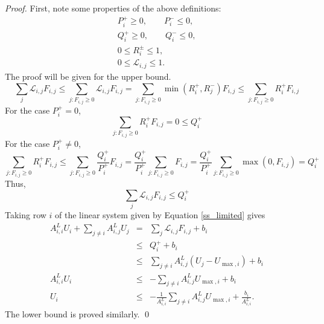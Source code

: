 \begin{proof}
   First, note some properties of the above definitions:
   \begin{gather*}
      P_i^+ \geq 0, \qquad P_i^- \leq 0,\\
      Q_i^+ \geq 0, \qquad Q_i^- \leq 0,\\
      0 \leq R_i^\pm \leq 1,\\
      0 \leq \mathcal{L}_{i,j} \leq 1.
   \end{gather*}
   The proof will be given for the upper bound.
   \[
      \sum\limits_j \mathcal{L}_{i,j}F_{i,j}
         \leq \sum\limits_{j:F_{i,j}\geq 0} \mathcal{L}_{i,j}F_{i,j}
         = \sum\limits_{j:F_{i,j}\geq 0} \min(R_i^+,R_j^-)F_{i,j}
         \leq \sum\limits_{j:F_{i,j}\geq 0} R_i^+ F_{i,j}
   \]
   For the case $P_i^+ = 0$,
   \[
      \sum\limits_{j:F_{i,j}\geq 0} R_i^+ F_{i,j} = 0 \leq Q_i^+
   \]
   For the case $P_i^+ \ne 0$,
   \[
      \sum\limits_{j:F_{i,j}\geq 0} R_i^+ F_{i,j}
      \leq \sum\limits_{j:F_{i,j}\geq 0}\frac{Q_i^+}{P_i^+} F_{i,j}
      = \frac{Q_i^+}{P_i^+} \sum\limits_{j:F_{i,j}\geq 0} F_{i,j}
      = \frac{Q_i^+}{P_i^+} \sum\limits_{j:F_{i,j}\geq 0} \max(0,F_{i,j})
      = Q_i^+
   \]
   Thus,
   \[
      \sum\limits_j \mathcal{L}_{i,j}F_{i,j} \leq Q_i^+
   \]
   Taking row $i$ of the linear system given by Equation \ref{ss_limited} gives
   \begin{eqnarray*}
      A^L_{i,i} U_i + \sum\limits_{j\ne i} A_{i,j}^L U_j
         & = & \sum\limits_j \mathcal{L}_{i,j}F_{i,j} + b_i\\
         & \leq & Q_i^+ + b_i\\
         & \leq & \sum\limits_{j\ne i}A_{i,j}^L(U_j - U_{\max,i}) + b_i\\
      A^L_{i,i} U_i & \leq & -\sum\limits_{j\ne i} A_{i,j}^L U_{\max,i} + b_i\\
      U_i & \leq & -\frac{1}{A^L_{i,i}}\sum\limits_{j\ne i} A_{i,j}^L U_{\max,i}
         + \frac{b_i}{A^L_{i,i}}.
   \end{eqnarray*}
   The lower bound is proved similarly.
   \qed
\end{proof}